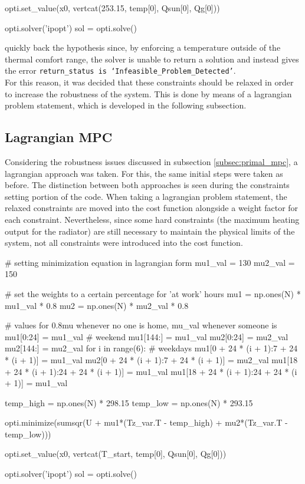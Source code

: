 \begin{python}
opti.set_value(x0, vertcat(253.15, temp[0], Qsun[0], Qg[0]))

opti.solver('ipopt')
sol = opti.solve()
\end{python}

quickly back the hypothesis since, by enforcing a temperature outside of the thermal comfort range, the solver is unable to return a solution and instead gives the error \texttt{return\_status is `Infeasible\_Problem\_Detected'}.\\

For this reason, it was decided that these constraints should be relaxed in order to increase the robustness of the system. This is done by means of a lagrangian problem statement, which is developed in the following subsection.

\newpage
\subsection{Lagrangian MPC}
\label{subsec:lagrangian_mpc}
Considering the robustness issues discussed in subsection \ref{subsec:primal_mpc}, a lagrangian approach was taken. For this, the same initial steps were taken as before. The distinction between both approaches is seen during the constraints setting portion of the code. When taking a lagrangian problem statement, the relaxed constraints are moved into the cost function alongside a weight factor for each constraint. Nevertheless, since some hard constraints (the maximum heating output for the radiator) are still necessary to maintain the physical limits of the system, not all constraints were introduced into the cost function. 

\begin{python}
    # setting minimization equation in lagrangian form
    mu1_val = 130
    mu2_val = 150

    # set the weights to a certain percentage for 'at work' hours
    mu1 = np.ones(N) * mu1_val * 0.8
    mu2 = np.ones(N) * mu2_val * 0.8

    # values for 0.8mu whenever no one is home, mu_val whenever someone is
    mu1[0:24] = mu1_val  # weekend
    mu1[144:] = mu1_val
    mu2[0:24] = mu2_val
    mu2[144:] = mu2_val
    for i in range(6):  # weekdays
        mu1[0 + 24 * (i + 1):7 + 24 * (i + 1)] = mu1_val
        mu2[0 + 24 * (i + 1):7 + 24 * (i + 1)] = mu2_val
        mu1[18 + 24 * (i + 1):24 + 24 * (i + 1)] = mu1_val
        mu1[18 + 24 * (i + 1):24 + 24 * (i + 1)] = mu1_val

    temp_high = np.ones(N) * 298.15
    temp_low = np.ones(N) * 293.15

    opti.minimize(sumsqr(U + mu1*(Tz_var.T - temp_high) + mu2*(Tz_var.T - temp_low)))

    opti.set_value(x0, vertcat(T_start, temp[0], Qsun[0], Qg[0]))

    opti.solver('ipopt')
    sol = opti.solve()
\end{python}

